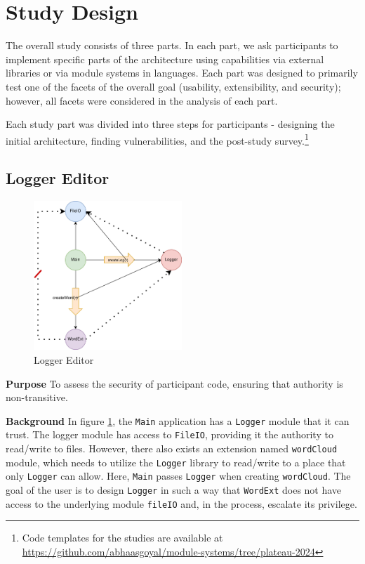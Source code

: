 \section{Study Design}\label{sec-content}
\noindent
The overall study consists of three parts. In each part, we ask participants to implement specific parts of the architecture using capabilities via external libraries or via module systems in languages. Each part was designed to primarily test one of the facets of the overall goal (usability, extensibility, and security); however, all facets were considered in the analysis of each part.

Each study part was divided into three steps for participants - designing the initial architecture, finding vulnerabilities, and the post-study survey.\footnote{Code templates for the studies are available at \url{https://github.com/abhaasgoyal/module-systems/tree/plateau-2024}} 

\subsection{Logger Editor} \label{sec:loggerEditor}
\begin{figure}[htbp]
\centering
\includegraphics[width=2.2in]{figures/Ambient_logger.jpg}
\caption{Logger Editor}
\label{loggerEditor}
\end{figure}
\noindent
\textbf{Purpose} To assess the security of participant code, ensuring that authority is non-transitive.

\noindent
\textbf{Background} In figure \ref{loggerEditor}, the \texttt{Main} application has a \texttt{Logger} module that it can trust. The logger module has access to \texttt{FileIO}, providing it the authority to read/write to files. However, there also exists an extension named \texttt{wordCloud} module, which needs to utilize the \texttt{Logger} library to read/write to a place that only \texttt{Logger} can allow. Here, \texttt{Main} passes \texttt{Logger} when creating \texttt{wordCloud}. The goal of the user is to design \texttt{Logger} in such a way that \texttt{WordExt} does not have access to the underlying module \texttt{fileIO} and, in the process, escalate its privilege.

